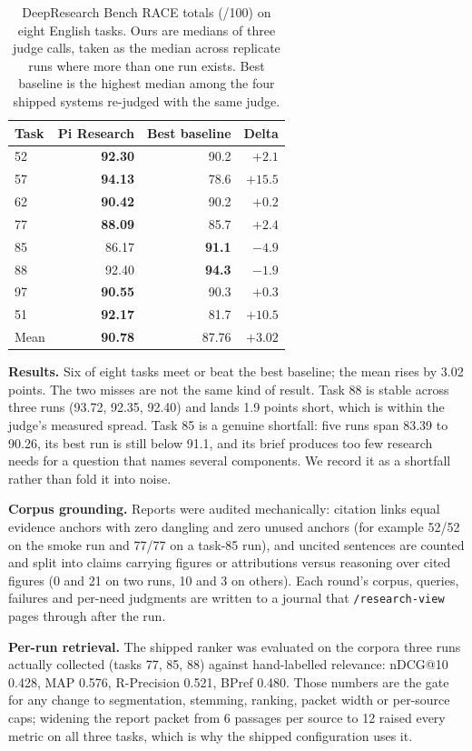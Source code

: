 \documentclass[conference]{IEEEtran}
\begin{document}
\begin{table}[t]
\centering\footnotesize
\caption{DeepResearch Bench RACE totals (/100) on eight English tasks. Ours are medians of three judge calls, taken as the median across replicate runs where more than one run exists. Best baseline is the highest median among the four shipped systems re-judged with the same judge.}
\label{tab:eight}
\begin{tabular}{lrrr}
\toprule
\rowcolor{lightblue} Task & Pi Research & Best baseline & Delta \\
\midrule
52 & \textbf{92.30} & 90.2 & $+2.1$ \\
57 & \textbf{94.13} & 78.6 & $+15.5$ \\
62 & \textbf{90.42} & 90.2 & $+0.2$ \\
77 & \textbf{88.09} & 85.7 & $+2.4$ \\
85 & 86.17 & \textbf{91.1} & $-4.9$ \\
88 & 92.40 & \textbf{94.3} & $-1.9$ \\
97 & \textbf{90.55} & 90.3 & $+0.3$ \\
51 & \textbf{92.17} & 81.7 & $+10.5$ \\
\midrule
Mean & \textbf{90.78} & 87.76 & $+3.02$ \\
\bottomrule
\end{tabular}
\end{table}

\textbf{Results.} Six of eight tasks meet or beat the best baseline; the mean rises by 3.02 points. The two misses are not the same kind of result. Task 88 is stable across three runs (93.72, 92.35, 92.40) and lands 1.9 points short, which is within the judge's measured spread. Task 85 is a genuine shortfall: five runs span 83.39 to 90.26, its best run is still below 91.1, and its brief produces too few research needs for a question that names several components. We record it as a shortfall rather than fold it into noise.

\textbf{Corpus grounding.} Reports were audited mechanically: citation links equal evidence anchors with zero dangling and zero unused anchors (for example 52/52 on the smoke run and 77/77 on a task-85 run), and uncited sentences are counted and split into claims carrying figures or attributions versus reasoning over cited figures (0 and 21 on two runs, 10 and 3 on others). Each round's corpus, queries, failures and per-need judgments are written to a journal that \texttt{/research-view} pages through after the run.

\textbf{Per-run retrieval.} The shipped ranker was evaluated on the corpora three runs actually collected (tasks 77, 85, 88) against hand-labelled relevance: nDCG@10 0.428, MAP 0.576, R-Precision 0.521, BPref 0.480. Those numbers are the gate for any change to segmentation, stemming, ranking, packet width or per-source caps; widening the report packet from 6 passages per source to 12 raised every metric on all three tasks, which is why the shipped configuration uses it.
\end{document}
